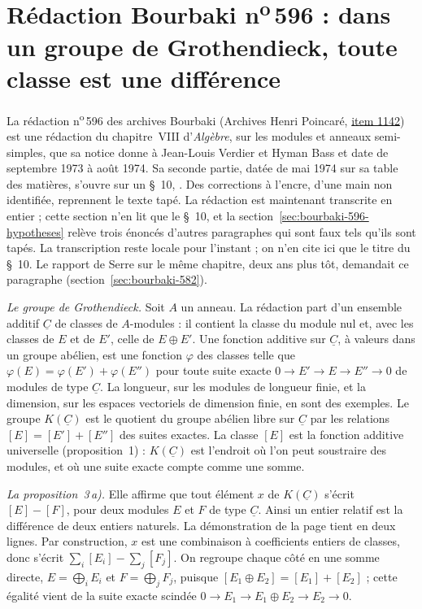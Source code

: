 \section[Rédaction Bourbaki n\textsuperscript{o}\,596 : toute classe est une différence]{Rédaction Bourbaki n\textsuperscript{o}\,596 : dans un groupe de Grothendieck, toute classe est une différence\protect{}}\label{sec:bourbaki-596}

La rédaction n\textsuperscript{o}\,596 des archives Bourbaki (Archives Henri Poincaré, \href{https://archives-bourbaki.ahp-numerique.fr/items/show/1142}{item 1142}) est une rédaction du chapitre~VIII d'\emph{Algèbre}, sur les modules et anneaux semi-simples, que sa notice donne à Jean-Louis Verdier et Hyman Bass et date de septembre 1973 à août 1974. Sa seconde partie, datée de mai 1974 sur sa table des matières, s'ouvre sur un §~10, . Des corrections à l'encre, d'une main non identifiée, reprennent le texte tapé. La rédaction est maintenant transcrite en entier ; cette section n'en lit que le §~10, et la section~\ref{sec:bourbaki-596-hypotheses} relève trois énoncés d'autres paragraphes qui sont faux tels qu'ils sont tapés. La transcription reste locale pour l'instant ; on n'en cite ici que le titre du §~10. Le rapport de Serre sur le même chapitre, deux ans plus tôt, demandait ce paragraphe (section~\ref{sec:bourbaki-582}).

\emph{Le groupe de Grothendieck.} Soit $A$ un anneau. La rédaction part d'un ensemble additif $\underline C$ de classes de $A$-modules : il contient la classe du module nul et, avec les classes de $E$ et de $E'$, celle de $E \oplus E'$. Une fonction additive sur $\underline C$, à valeurs dans un groupe abélien, est une fonction $\varphi$ des classes telle que $\varphi(E) = \varphi(E') + \varphi(E'')$ pour toute suite exacte $0 \to E' \to E \to E'' \to 0$ de modules de type $\underline C$. La longueur, sur les modules de longueur finie, et la dimension, sur les espaces vectoriels de dimension finie, en sont des exemples. Le groupe $K(\underline C)$ est le quotient du groupe abélien libre sur $\underline C$ par les relations $[E] = [E'] + [E'']$ des suites exactes. La classe $[E]$ est la fonction additive universelle (proposition~1) : $K(\underline C)$ est l'endroit où l'on peut soustraire des modules, et où une suite exacte compte comme une somme.

\emph{La proposition~3\,a).} Elle affirme que tout élément $x$ de $K(\underline C)$ s'écrit $[E] - [F]$, pour deux modules $E$ et $F$ de type $\underline C$. Ainsi un entier relatif est la différence de deux entiers naturels. La démonstration de la page tient en deux lignes. Par construction, $x$ est une combinaison à coefficients entiers de classes, donc s'écrit $\sum_i [E_i] - \sum_j [F_j]$. On regroupe chaque côté en une somme directe, $E = \bigoplus_i E_i$ et $F = \bigoplus_j F_j$, puisque $[E_1 \oplus E_2] = [E_1] + [E_2]$ ; cette égalité vient de la suite exacte scindée $0 \to E_1 \to E_1 \oplus E_2 \to E_2 \to 0$.

